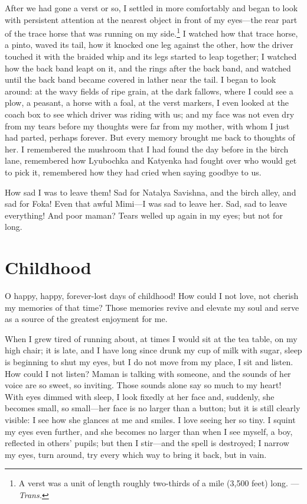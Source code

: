 After we had gone a verst or so, I settled in more comfortably and began to look with persistent attention at the nearest object in front of my eyes---the rear part of the trace horse that was running on my side.\footnote{A verst was a unit of length roughly two-thirds of a mile (3,500 feet) long. ---\textit{Trans.}} I watched how that trace horse, a pinto, waved its tail, how it knocked one leg against the other, how the driver touched it with the braided whip and its legs started to leap together; I watched how the back band leapt on it, and the rings after the back band, and watched until the back band became covered in lather near the tail. I began to look around: at the wavy fields of ripe grain, at the dark fallows, where I could see a plow, a peasant, a horse with a foal, at the verst markers, I even looked at the coach box to see which driver was riding with us; and my face was not even dry from my tears before my thoughts were far from my mother, with whom I just had parted, perhaps forever. But every memory brought me back to thoughts of her. I remembered the mushroom that I had found the day before in the birch lane, remembered how Lyubochka and Katyenka had fought over who would get to pick it, remembered how they had cried when saying goodbye to us.

How sad I was to leave them! Sad for Natalya Savishna, and the birch alley, and sad for Foka! Even that awful Mimi---I was sad to leave her. Sad, sad to leave everything! And poor maman? Tears welled up again in my eyes; but not for long.

\chapter{Childhood} %

O happy, happy, forever-lost days of childhood! How could I not love, not cherish my memories of that time? Those memories revive and elevate my soul and serve as a source of the greatest enjoyment for me.

When I grew tired of running about, at times I would sit at the tea table, on my high chair; it is late, and I have long since drunk my cup of milk with sugar, sleep is beginning to shut my eyes, but I do not move from my place, I sit and listen. How could I not listen? Maman is talking with someone, and the sounds of her voice are so sweet, so inviting. Those sounds alone say so much to my heart! With eyes dimmed with sleep, I look fixedly at her face and, suddenly, she becomes small, so small---her face is no larger than a button; but it is still clearly visible: I see how she glances at me and smiles. I love seeing her so tiny. I squint my eyes even further, and she becomes no larger than when I see myself, a boy, reflected in others' pupils; but then I stir---and the spell is destroyed; I narrow my eyes, turn around, try every which way to bring it back, but in vain.

